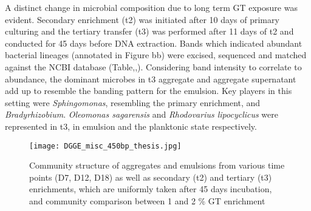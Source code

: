 \documentclass[11pt]{article}
\begin{document}
A distinct change in microbial composition due to long term GT exposure was evident. Secondary enrichment (t2) was initiated after 10 days of primary culturing and the tertiary transfer (t3) was performed after 11 days of t2 and conducted for 45 days before DNA extraction. Bands which indicated abundant bacterial lineages (annotated in Figure bb) were excised, sequenced and matched against the NCBI database (Table,,). 
Considering band intensity to correlate to abundance, the dominant microbes in t3 aggregate and aggregate supernatant add up to resemble the banding pattern for the emulsion. 
Key players in this setting were \emph{Sphingomonas}, resembling the primary enrichment, and \emph{Bradyrhizobium}. \emph{Oleomonas sagarensis} and \emph{Rhodovarius lipocyclicus} were represented in t3, in emulsion and the planktonic state respectively.

\begin{figure}
\texttt{[image: DGGE\_misc\_450bp\_thesis.jpg]}
\caption{Community structure of aggregates and emulsions from various time points (D7, D12, D18) as well as secondary (t2) and tertiary (t3) enrichments, which are uniformly taken after 45 days incubation, and community comparison between 1 and 2 \% GT enrichment}
\end{figure}
\end{document}
